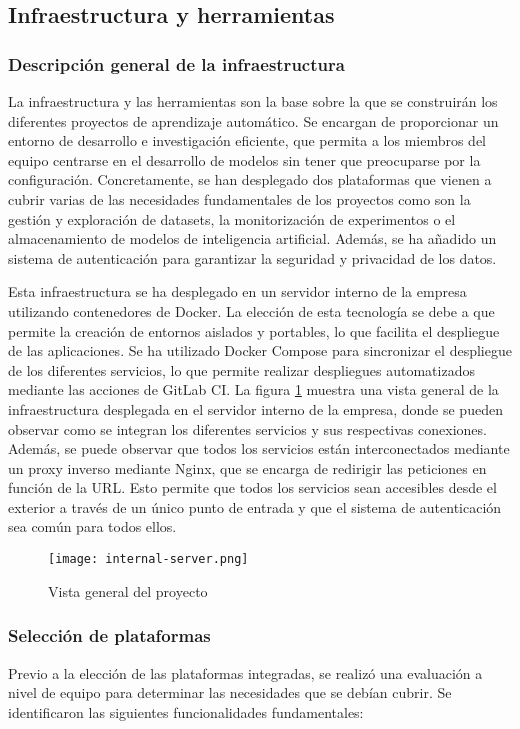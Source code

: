 \subsection{Infraestructura y herramientas}
\subsubsection{Descripción general de la infraestructura}
La infraestructura y las herramientas son la base sobre la que se construirán
los diferentes proyectos de aprendizaje automático. Se encargan de proporcionar
un entorno de desarrollo e investigación eficiente, que permita a los miembros
del equipo centrarse en el desarrollo de modelos sin tener que preocuparse por
la configuración. Concretamente, se han desplegado dos plataformas 
que vienen a cubrir varias de las necesidades fundamentales de los proyectos
como son la gestión y exploración de datasets, la monitorización de experimentos o
el almacenamiento de modelos de inteligencia artificial. Además, se ha añadido un sistema de autenticación 
para garantizar la seguridad y privacidad de los datos.\medskip

Esta infraestructura se ha desplegado en un servidor interno de la empresa
utilizando contenedores de Docker. La elección de esta tecnología se debe a
que permite la creación de entornos aislados y portables, lo que facilita el
despliegue de las aplicaciones. Se ha utilizado Docker Compose para
sincronizar el despliegue de los diferentes servicios, lo que permite
realizar despliegues automatizados mediante las acciones de GitLab CI. La
figura \ref{fig:internal-server} muestra una vista general de la infraestructura
desplegada en el servidor interno de la empresa, donde se pueden observar
como se integran los diferentes servicios y sus respectivas conexiones. Además,
se puede observar que todos los servicios están interconectados mediante un
proxy inverso mediante Nginx, que se encarga de redirigir las peticiones en 
función de la URL. Esto permite que todos los servicios sean
accesibles desde el exterior a través de un único punto de entrada y que el
sistema de autenticación sea común para todos ellos.

\begin{figure}[ht]
    \centering
    \texttt{[image: internal-server.png]}
    \caption{Vista general del proyecto}\label{fig:internal-server}
\end{figure}

\subsubsection{Selección de plataformas}
Previo a la elección de las plataformas integradas, se realizó una evaluación
a nivel de equipo para determinar las necesidades que se debían cubrir. Se
identificaron las siguientes funcionalidades fundamentales:

